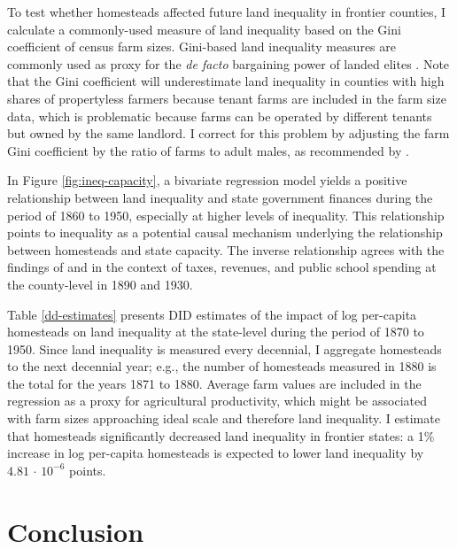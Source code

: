 To test whether homesteads affected future land inequality in frontier counties, I calculate a commonly-used measure of land inequality based on the Gini coefficient of census farm sizes. Gini-based land inequality measures are commonly used as proxy for the \emph{de facto} bargaining power of landed elites \citep[e.g.,][]{boix2003democracy,ziblatt2008does,ansell2015}. Note that the Gini coefficient will underestimate land inequality in counties with high shares of propertyless farmers because tenant farms are included in the farm size data, which is problematic because farms can be operated by different tenants but owned by the same landlord. I correct for this problem by adjusting the farm Gini coefficient by the ratio of farms to adult males, as recommended by \citet{vollrath2013inequality}.

In Figure \ref{fig:ineq-capacity}, a bivariate regression model yields a positive relationship between land inequality and state government finances during the period of 1860 to 1950, especially at higher levels of inequality. This relationship points to inequality as a potential causal mechanism underlying the relationship between homesteads and state capacity. The inverse relationship agrees with the findings of \citet{ramcharan2010inequality} and \citet{vollrath2013inequality} in the context of taxes, revenues, and public school spending at the county-level in 1890 and 1930.

Table \ref{dd-estimates} presents DID estimates of the impact of log per-capita homesteads on land inequality at the state-level during the period of 1870 to 1950. Since land inequality is measured every decennial, I aggregate homesteads to the next decennial year; e.g., the number of homesteads measured in 1880 is the total for the years 1871 to 1880. Average farm values are included in the regression as a proxy for agricultural productivity, which might be associated with farm sizes approaching ideal scale and therefore land inequality. I estimate that homesteads significantly decreased land inequality in frontier states: a 1\% increase in log per-capita homesteads is expected to lower  land inequality by $4.81\,\cdot\,10^{-6}$ points. 

\section{Conclusion} \label{discussion-ch1} 

